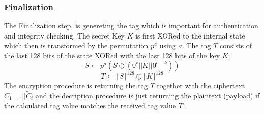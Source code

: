 \subsubsection{Finalization}
The Finalization step, is genereting the tag which is important for authentication and integrity checking.
The secret Key $K$ is first XORed to the internal state which then is transformed by the permutation $p^a$ using $a$. The tag $T$ consists of the last 128 bits of the state XORed with the last 128 bits of the key $K$: %
$$S \leftarrow p^a(S \oplus (0^r || K || 0^{c-k}))$$
$$ T \leftarrow \lceil S  \rceil^{128} \oplus \lceil K \rceil^{128}$$
The encryption procedure is returning the tag $T$ together with the ciphertext $C_1||...||\tilde C_t$ and the decription procedure is just returning the plaintext (payload) if the calculated tag value matches the received tag value $T$ \cite{DBLP:journals/joc/DobraunigEMS21}.